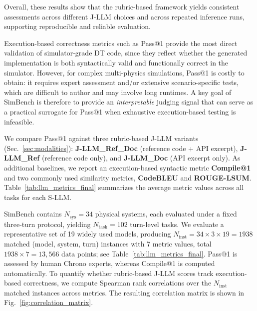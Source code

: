 Overall, these results show that the rubric-based framework yields consistent assessments across different J-LLM choices and across repeated inference runs, supporting reproducible and reliable evaluation. 

\medskip


{}
Execution-based correctness metrics such as Pass@1 provide the most direct validation of simulator-grade DT code, since they reflect whether the generated implementation is both syntactically valid and functionally correct in the simulator.
However, for complex multi-physics simulations, Pass@1 is costly to obtain: it requires expert assessment and/or extensive scenario-specific tests, which are difficult to author and may involve long runtimes.
A key goal of SimBench is therefore to provide an \emph{interpretable} judging signal that can serve as a practical surrogate for Pass@1 when exhaustive execution-based testing is infeasible.

We compare Pass@1 against three rubric-based J-LLM variants (Sec.~\ref{sec:modalities}): \textbf{J-LLM\_Ref\_Doc} (reference code + API excerpt), \textbf{J-LLM\_Ref} (reference code only), and \textbf{J-LLM\_Doc} (API excerpt only).
As additional baselines, we report an execution-based syntactic metric \textbf{Compile@1} and two commonly used similarity metrics, \textbf{CodeBLEU} and \textbf{ROUGE-LSUM}.
Table~\ref{tab:llm_metrics_final} summarizes the average metric values across all tasks for each S-LLM.

SimBench contains $N_{\text{sys}}=34$ physical systems, each evaluated under a fixed three-turn protocol, yielding $N_{\text{task}}=102$ turn-level tasks.
We evaluate a representative set of 19 widely used models, producing
$N_{\text{inst}} = 34 \times 3 \times 19 = 1938$ matched (model, system, turn) instances with 7 metric values, total $1938 \times 7 = 13,566$ data points; see Table~\ref{tab:llm_metrics_final}.
Pass@1 is assessed by human Chrono experts, whereas Compile@1 is computed automatically.
To quantify whether rubric-based J-LLM scores track execution-based correctness, we compute Spearman rank correlations over the $N_{\text{inst}}$ matched instances across metrics.
The resulting correlation matrix is shown in Fig.~\ref{fig:correlation_matrix}.

